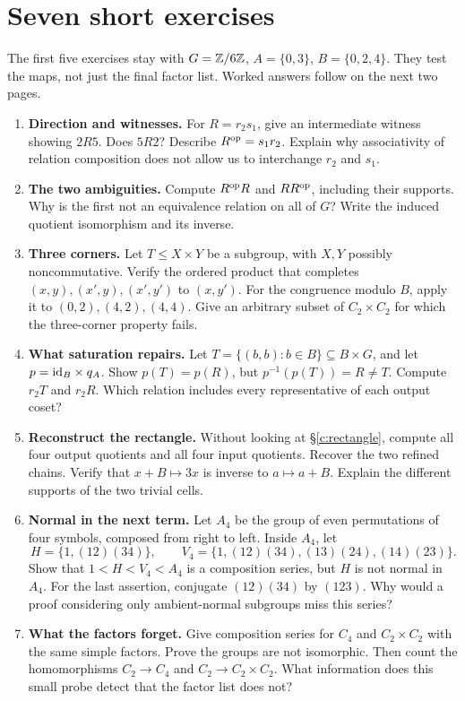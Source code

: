 \clearpage
\section{Seven short exercises}\label{c:exercises}
The first five exercises stay with \(G=\mathbb Z/6\mathbb Z\),
\(A=\{0,3\}\), \(B=\{0,2,4\}\). They test the maps, not just the final
factor list. Worked answers follow on the next two pages.

\begin{enumerate}
\item \textbf{Direction and witnesses.}
For \(R=r_2s_1\), give an intermediate witness showing \(2R5\).
Does \(5R2\)? Describe \(R^{\mathrm{op}}=s_1r_2\).
Explain why associativity of relation composition does not allow us
to interchange \(r_2\) and \(s_1\).

\item \textbf{The two ambiguities.}
Compute \(R^{\mathrm{op}} R\) and \(RR^{\mathrm{op}}\), including their supports.
Why is the first not an equivalence relation on all of \(G\)?
Write the induced quotient isomorphism and its inverse.

\item \textbf{Three corners.}
Let \(T\leq X\times Y\) be a subgroup, with \(X,Y\) possibly
noncommutative. Verify the ordered product that completes
\((x,y),(x',y),(x',y')\) to \((x,y')\).
For the congruence modulo \(B\), apply it to
\((0,2),(4,2),(4,4)\).
Give an arbitrary subset of \(C_2\times C_2\) for which the
three-corner property fails.

\item \textbf{What saturation repairs.}
Let \(T=\{(b,b):b\in B\}\subseteq B\times G\), and let
\(p=\mathrm{id}_B\times q_A\).
Show \(p(T)=p(R)\), but \(p^{-1}(p(T))=R\ne T\).
Compute \(r_2T\) and \(r_2R\). Which relation includes every representative
of each output coset?

\item \textbf{Reconstruct the rectangle.}
Without looking at §\ref{c:rectangle}, compute all four output quotients
and all four input quotients. Recover the two refined chains.
Verify that \(x+B\mapsto3x\) is inverse to \(a\mapsto a+B\).
Explain the different supports of the two trivial cells.

\item \textbf{Normal in the next term.}
Let \(A_4\) be the group of even permutations of four symbols, composed
from right to left. Inside \(A_4\), let
\[
 H=\{1,(12)(34)\},\qquad
 V_4=\{1,(12)(34),(13)(24),(14)(23)\}.
\]
Show that \(1<H<V_4<A_4\) is a composition series, but
\(H\) is not normal in \(A_4\).
For the last assertion, conjugate \((12)(34)\) by \((123)\).
Why would a proof considering only ambient-normal subgroups miss this
series?

\item \textbf{What the factors forget.}
Give composition series for \(C_4\) and \(C_2\times C_2\) with the same
simple factors. Prove the groups are not isomorphic.
Then count the homomorphisms \(C_2\to C_4\) and
\(C_2\to C_2\times C_2\). What information does this small probe detect
that the factor list does not?
\end{enumerate}

